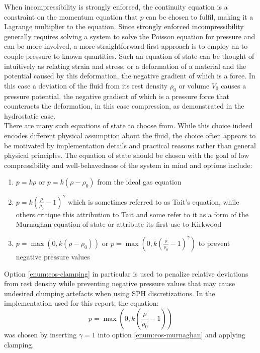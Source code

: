 When incompressibility is strongly enforced, the continuity equation is a constraint on the momentum equation that $p$ can be chosen to fulfil, making it a Lagrange multiplier to the equation\autocite*{tutorial}. Since strongly enforced incompressibility generally requires solving a system to solve the Poisson equation for pressure and can be more involved, a more straightforward first approach is to employ an  to couple pressure to known quantities. Such an equation of state can be thought of intuitively as relating strain and stress, or a deformation of a material and the potential caused by this deformation, the negative gradient of which is a force. In this case a deviation of the fluid from its rest density $\rho_0$ or volume $V_0$ causes a pressure potential, the negative gradient of which is a pressure force that counteracts the deformation, in this case compression, as demonstrated in the hydrostatic case.\\


There are many such equations of state to choose from. While this choice indeed encodes different physical assumption about the fluid, the choice often appears to be motivated by implementation details and practical reasons rather than general physical principles. The equation of state should be chosen with the goal of low compressibility and well-behavedness of the system in mind and options include:


\begin{enumerate}
    \item $p = k\rho$ or $p=k(\rho-\rho_0)$ from the ideal gas equation \autocite*{wcsph}
    \item\label{enum:eos-murnaghan} $p=k\left(\frac{\rho}{\rho_0}-1\right)^\gamma$ which is sometimes referred to as Tait's equation\autocite*{wcsph}, while others critique this attribution to Tait\autocite*{moanghan-2012-sph-and-its-diverse-applications} and some refer to it as a form of the Murnaghan equation of state\autocite*{macdonald-state-equations-murnaghan} or attribute its first use to Kirkwood\autocite*{macdonald-state-equations-murnaghan}
    \item\label{enum:eos-clamping} $p=\max\left(0, k(\rho-\rho_0)\right)$ or $p=\max\left(0, k\left(\frac{\rho}{\rho_0}-1\right)^\gamma\right)$ to prevent negative pressure values\autocite*{tutorial}
\end{enumerate}

Option \ref{enum:eos-clamping} in particular is used to penalize relative deviations from rest density while preventing negative pressure values that may cause undesired clumping artefacts when using SPH discretizations. In the implementation used for this report, the equation:
\begin{equation}\label{eq:state-equation}
    p=\max\left(0, k\left(\frac{\rho}{\rho_0}-1\right)\right)
\end{equation}
was chosen by inserting $\gamma=1$ into option \ref{enum:eos-murnaghan} and applying clamping.


